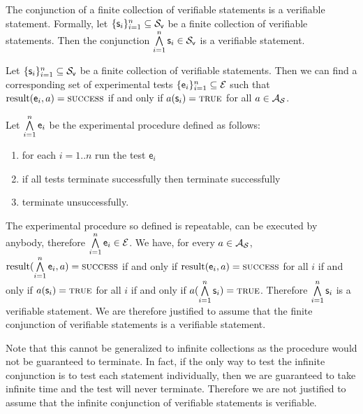 	\begin{mathSection}
		\begin{axiom}\label{pm-vs-axiomFiniteConjunction}
			The conjunction of a finite collection of verifiable statements is a verifiable statement. Formally, let $\{\mathsf{s}_i\}_{i=1}^{n} \subseteq \mathcal{S}_\textsf{v}$ be a finite collection of verifiable statements. Then the conjunction $\bigwedge\limits_{i=1}^{n} \mathsf{s}_i \in \mathcal{S}_\textsf{v}$ is a verifiable statement.
		\end{axiom}
		\begin{justification}
			Let $\{\mathsf{s}_i\}_{i=1}^{n} \subseteq \mathcal{S}_\textsf{v}$ be a finite collection of verifiable statements. Then we can find a corresponding set of experimental tests $\{\mathsf{e}_i\}_{i=1}^{n} \subseteq \mathcal{E}$ such that $\operatorname{result}(\mathsf{e}_i, a) = \textsc{success}$ if and only if $a(\mathsf{s}_i) = \textup{\textsc{true}}$ for all $a \in \mathcal{A}_{\mathcal{S}}$.
			
			Let $\bigwedge\limits_{i=1}^{n} \mathsf{e}_i$ be the experimental procedure defined as follows:
			\begin{enumerate}
				\item for each $i=1..n$ run the test $\mathsf{e}_i$
				\item if all tests terminate successfully then terminate successfully
				\item terminate unsuccessfully.
			\end{enumerate}
			The experimental procedure so defined is repeatable, can be executed by anybody, therefore $\bigwedge\limits_{i=1}^{n} \mathsf{e}_i \in \mathcal{E}$. We have, for every $a \in \mathcal{A}_{\mathcal{S}}$, $\operatorname{result}(\bigwedge\limits_{i=1}^{n} \mathsf{e}_i, a) = \textsc{success}$ if and only if $\operatorname{result}(\mathsf{e}_i, a) = \textsc{success}$ for all $i$ if and only if $a(\mathsf{s}_i) = \textup{\textsc{true}}$ for all $i$ if and only if $a(\bigwedge\limits_{i=1}^{n}\mathsf{s}_i) = \textup{\textsc{true}}$. Therefore $\bigwedge\limits_{i=1}^{n}\mathsf{s}_i$ is a verifiable statement. We are therefore justified to assume that the finite conjunction of verifiable statements is a verifiable statement.
			
			Note that this cannot be generalized to infinite collections as the procedure would not be guaranteed to terminate. In fact, if the only way to test the infinite conjunction is to test each statement individually, then we are guaranteed to take infinite time and the test will never terminate. Therefore we are not justified to assume that the infinite conjunction of verifiable statements is verifiable.
		\end{justification}
	\end{mathSection}	
	
